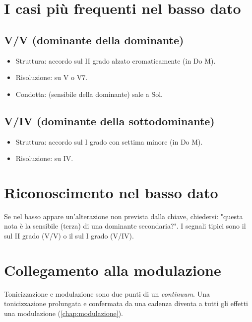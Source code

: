 \section{I casi più frequenti nel basso dato}
\label{sec:casi_frequenti}

\subsection{V/V (dominante della dominante)}
\begin{itemize}
    \item Struttura: accordo sul II grado alzato cromaticamente (\Fadiesis  in Do M).
    \item Risoluzione: su V o V7.
    \item Condotta: \Fadiesis  (sensibile della dominante) sale a Sol.
\end{itemize}

\subsection{V/IV (dominante della sottodominante)}
\begin{itemize}
    \item Struttura: accordo sul I grado con settima minore (\Sibemolle  in Do M).
    \item Risoluzione: su IV.
\end{itemize}

\section{Riconoscimento nel basso dato}
\label{sec:riconoscimento}

\begin{regola}
    Se nel basso appare un'alterazione non prevista dalla chiave, chiedersi: "questa nota è la sensibile (terza) di una dominante secondaria?". I segnali tipici sono il \Fadiesis  sul II grado (V/V) o il \Sibemolle  sul I grado (V/IV).
\end{regola}

\section{Collegamento alla modulazione}
\label{sec:collegamento_mod}

Tonicizzazione e modulazione sono due punti di un \textit{continuum}. Una tonicizzazione prolungata e confermata da una cadenza diventa a tutti gli effetti una modulazione (\ref{chap:modulazione}).
